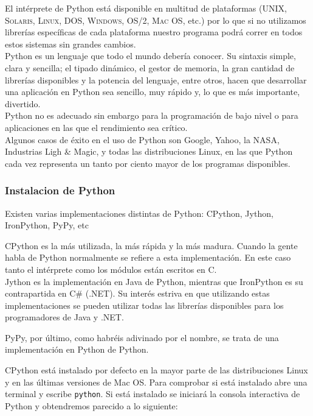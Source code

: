 \documentclass[12pt]{book} %
\begin{document}
		El intérprete de Python está disponible en multitud de plataformas (\textsc{UNIX, Solaris, Linux, DOS, Windows, OS/2, Mac OS}, etc.)
		por lo que si no utilizamos librerías específicas de cada plataforma nuestro programa podrá correr en todos estos sistemas sin
		grandes cambios.\\
		Python es un lenguaje que todo el mundo debería conocer. Su sintaxis simple, clara y sencilla; el tipado dinámico, el gestor de
		memoria, la gran cantidad de librerías disponibles y la potencia del lenguaje, entre otros, hacen que desarrollar una aplicación en
		Python sea sencillo, muy rápido y, lo que es más importante, divertido.\\		
		
		Python no es adecuado sin embargo para la programación de bajo nivel o para aplicaciones en las que el rendimiento sea crítico.\\
		Algunos casos de éxito en el uso de Python son Google, Yahoo, la NASA, Industrias Ligh \& Magic, y todas las distribuciones Linux, 
		en  las que Python cada vez representa un tanto por ciento mayor de los programas disponibles.
		
		\subsubsection{Instalacion de Python}
			Existen varias implementaciones distintas de Python: CPython, Jython, IronPython, PyPy, etc	
			
			CPython es la más utilizada, la más rápida y la más madura. Cuando la gente habla de Python normalmente se refiere a esta
			implementación. 
			En este caso tanto el intérprete como los módulos están escritos en C.\\
			
			Jython es la implementación en Java de Python, mientras que IronPython es su contrapartida en C\# (.NET). Su interés estriva en 
			que utilizando estas implementaciones se pueden utilizar todas las librerías disponibles para los programadores de Java y .NET.

			PyPy, por último, como habréis adivinado por el nombre, se trata de una implementación en Python de Python.
			
			CPython está instalado por defecto en la mayor parte de las distribuciones Linux y en las últimas versiones de Mac OS. Para
			comprobar si está instalado abre una terminal y escribe \texttt{python}. Si está instalado se iniciará la consola interactiva 
			de Python y obtendremos parecido a lo siguiente:
			
\end{document}
